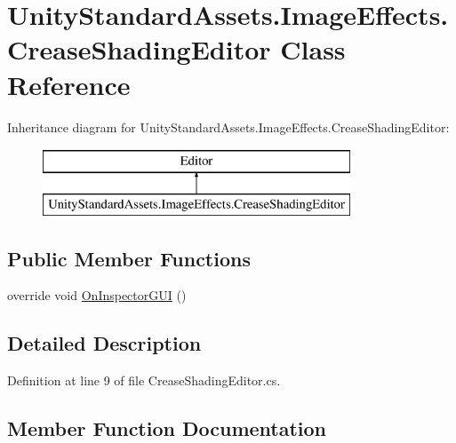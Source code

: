 \hypertarget{class_unity_standard_assets_1_1_image_effects_1_1_crease_shading_editor}{}\section{Unity\+Standard\+Assets.\+Image\+Effects.\+Crease\+Shading\+Editor Class Reference}
\label{class_unity_standard_assets_1_1_image_effects_1_1_crease_shading_editor}
Inheritance diagram for Unity\+Standard\+Assets.\+Image\+Effects.\+Crease\+Shading\+Editor\+:\begin{figure}[H]
\begin{center}
\leavevmode
\includegraphics[height=2.000000cm]{class_unity_standard_assets_1_1_image_effects_1_1_crease_shading_editor}
\end{center}
\end{figure}
\subsection*{Public Member Functions}
\begin{DoxyCompactItemize}
\item 
override void \mbox{\hyperlink{class_unity_standard_assets_1_1_image_effects_1_1_crease_shading_editor_a254fa7c869d24745c366658f687a607f}{On\+Inspector\+G\+UI}} ()
\end{DoxyCompactItemize}


\subsection{Detailed Description}


Definition at line 9 of file Crease\+Shading\+Editor.\+cs.



\subsection{Member Function Documentation}
\mbox{\label{class_unity_standard_assets_1_1_image_effects_1_1_crease_shading_editor_a254fa7c869d24745c366658f687a607f}} 
